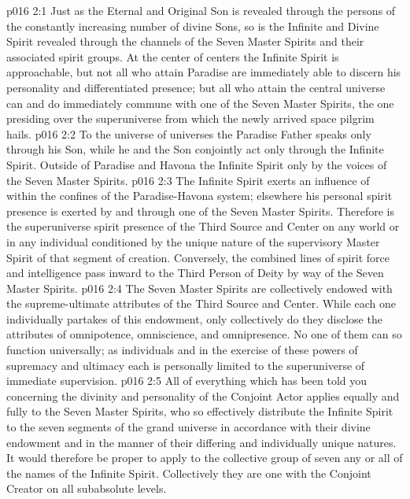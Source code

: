 \vs p016 2:1 Just as the Eternal and Original Son is revealed through the persons of the constantly increasing number of divine Sons, so is the Infinite and Divine Spirit revealed through the channels of the Seven Master Spirits and their associated spirit groups. At the center of centers the Infinite Spirit is approachable, but not all who attain Paradise are immediately able to discern his personality and differentiated presence; but all who attain the central universe can and do immediately commune with one of the Seven Master Spirits, the one presiding over the superuniverse from which the newly arrived space pilgrim hails.
\vs p016 2:2 To the universe of universes the Paradise Father speaks only through his Son, while he and the Son conjointly act only through the Infinite Spirit. Outside of Paradise and Havona the Infinite Spirit  only by the voices of the Seven Master Spirits.
\vs p016 2:3 \pc The Infinite Spirit exerts an influence of  within the confines of the Paradise\hyp{}Havona system; elsewhere his personal spirit presence is exerted by and through one of the Seven Master Spirits. Therefore is the superuniverse spirit presence of the Third Source and Center on any world or in any individual conditioned by the unique nature of the supervisory Master Spirit of that segment of creation. Conversely, the combined lines of spirit force and intelligence pass inward to the Third Person of Deity by way of the Seven Master Spirits.
\vs p016 2:4 \pc The Seven Master Spirits are collectively endowed with the supreme\hyp{}ultimate attributes of the Third Source and Center. While each one individually partakes of this endowment, only collectively do they disclose the attributes of omnipotence, omniscience, and omnipresence. No one of them can so function universally; as individuals and in the exercise of these powers of supremacy and ultimacy each is personally limited to the superuniverse of immediate supervision.
\vs p016 2:5 All of everything which has been told you concerning the divinity and personality of the Conjoint Actor applies equally and fully to the Seven Master Spirits, who so effectively distribute the Infinite Spirit to the seven segments of the grand universe in accordance with their divine endowment and in the manner of their differing and individually unique natures. It would therefore be proper to apply to the collective group of seven any or all of the names of the Infinite Spirit. Collectively they are one with the Conjoint Creator on all subabsolute levels.

